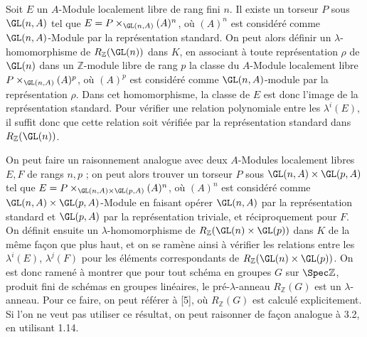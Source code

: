 Soit \(E\) un \(A\)-Module localement libre de rang fini \(n\). Il existe un torseur \(P\) sous \(\GL(n,A)\) tel que \(E=P\times_{\GL(n,A)} (A)^n\), où \((A)^n\) est considéré comme \(\GL(n,A)\)-Module par la représentation standard. On peut alors définir un \(\lambda\)-homomorphisme de \(R_{\mathbb Z}(\GL(n))\) dans \(K\), en associant à toute représentation \(\rho\) de \(\GL(n)\) dans un \(\mathbb Z\)-module libre de rang \(p\) la classe du \(A\)-Module localement libre
\(P\times_{\GL(n,A)} (A)^p\), où \((A)^p\) est considéré comme \(\GL(n,A)\)-module par la représentation \(\rho\). Dans cet homomorphisme, la classe de \(E\) est donc l'image de la représentation standard. Pour vérifier une relation polynomiale entre les \(\lambda^i(E)\), il suffit donc que cette relation soit vérifiée par la représentation standard dans \(R_{\mathbb Z}(\GL(n))\).

On peut faire un raisonnement analogue avec deux \(A\)-Modules localement libres \(E,F\) de rangs \(n,p\) ; on peut alors trouver un torseur \(P\) sous \(\GL(n,A)\times\GL(p,A)\) tel que \(E=P\times_{\GL(n,A)\times\GL(p,A)} (A)^n\), où \((A)^n\) est considéré comme \(\GL(n,A)\times\GL(p,A)\)-Module en faisant opérer \(\GL(n,A)\) par la représentation standard et \(\GL(p,A)\) par la représentation triviale, et réciproquement pour \(F\). On définit ensuite un \(\lambda\)-homomorphisme de \(R_{\mathbb Z}(\GL(n)\times\GL(p))\) dans \(K\) de la même façon que plus haut, et on se ramène ainsi à vérifier les relations entre les \(\lambda^i(E)\), \(\lambda^j(F)\) pour les éléments correspondants de \(R_{\mathbb Z}(\GL(n)\times\GL(p))\). On est donc ramené à montrer que pour tout schéma en groupes \(G\) sur \(\Spec\mathbb Z\), produit fini de schémas en groupes linéaires, le pré-\(\lambda\)-anneau \(R_{\mathbb Z}(G)\) est un \(\lambda\)-anneau. Pour ce faire, on peut référer à [5], où \(R_{\mathbb Z}(G)\) est calculé explicitement. Si l'on ne veut pas utiliser ce résultat, on peut raisonner de façon analogue à 3.2, en utilisant 1.14.

